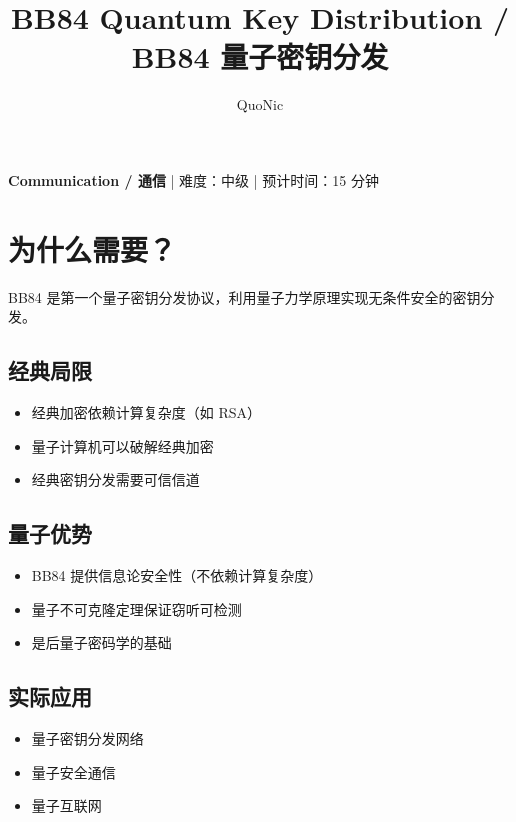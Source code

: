 \documentclass[12pt,a4paper]{article}
\title{BB84 Quantum Key Distribution / BB84 量子密钥分发}
\author{QuoNic}
\date{}
\begin{document}
\maketitle

\begin{center}
\textbf{Communication / 通信} | 难度：中级 | 预计时间：15 分钟
\end{center}

\tableofcontents
\newpage

\section{为什么需要？}

BB84 是第一个量子密钥分发协议，利用量子力学原理实现无条件安全的密钥分发。

\subsection{经典局限}
\begin{itemize}
  \item 经典加密依赖计算复杂度（如 RSA）
  \item 量子计算机可以破解经典加密
  \item 经典密钥分发需要可信信道
\end{itemize}

\subsection{量子优势}
\begin{itemize}
  \item BB84 提供信息论安全性（不依赖计算复杂度）
  \item 量子不可克隆定理保证窃听可检测
  \item 是后量子密码学的基础
\end{itemize}

\subsection{实际应用}
\begin{itemize}
  \item 量子密钥分发网络
  \item 量子安全通信
  \item 量子互联网
\end{itemize}

\end{document}
